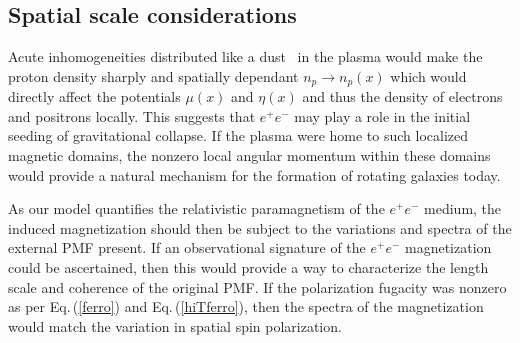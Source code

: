 \documentclass[aps,prd,floatfix,reprint]{revtex4-2}
\newcommand{\req}[1]{Eq.\,(\ref{#1})}
\begin{document}
{%
\subsection{Spatial scale considerations}
\label{sec:spatial}

\noindent Acute inhomogeneities distributed like a dust~\cite{Grayson:2023flr} in the plasma would make the proton density sharply and spatially dependant $n_{p}\rightarrow n_{p}(x)$ which would directly affect the potentials $\mu(x)$ and $\eta(x)$ and thus the density of electrons and positrons locally. This suggests that $e^{+}e^{-}$ may play a role in the initial seeding of gravitational collapse. If the plasma were home to such localized magnetic domains, the nonzero local angular momentum within these domains would provide a natural mechanism for the formation of rotating galaxies today.

As our model quantifies the relativistic paramagnetism of the $e^{+}e^{-}$ medium, the induced magnetization should then be subject to the variations and spectra of the external PMF present. If an observational signature of the $e^{+}e^{-}$ magnetization could be ascertained, then this would provide a way to characterize the length scale and coherence of the original PMF. If the polarization fugacity was nonzero as per \req{ferro} and \req{hiTferro}, then the spectra of the magnetization would match the variation in spatial spin polarization.}

\end{document}
